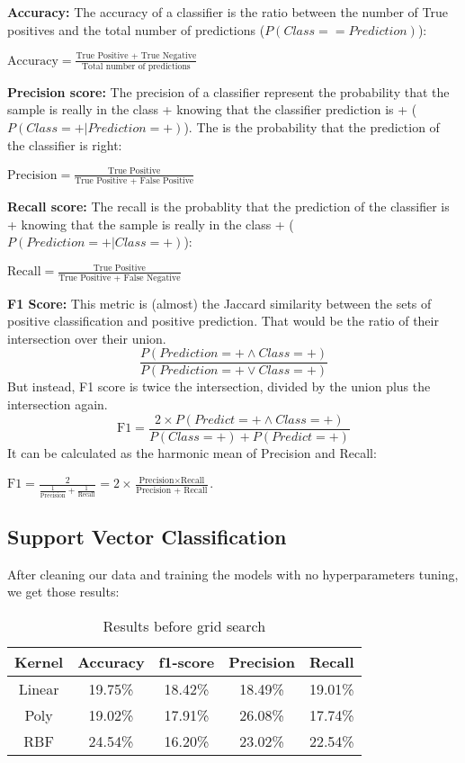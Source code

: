 \documentclass[twocolumn]{article}
\begin{document}
\textbf{Accuracy:} The accuracy of a classifier is the ratio between the number of True positives and the total number of predictions ($P(Class == Prediction)$): 

\(\displaystyle \text{Accuracy} = \frac{\text{True Positive + True Negative}}{\text{Total number of predictions}} \)

\textbf{Precision score:} The precision of a classifier represent the probability that the sample is really in the class + knowing that the classifier prediction is + ($P(Class=+ | Prediction = +)$). The is the probability that the prediction of the classifier is right:

\(\displaystyle \text{Precision} = \frac{\text{True Positive}}{\text{True Positive + False Positive}}\)

\textbf{Recall score:} The recall is the probablity that the prediction of the classifier is + knowing that the sample is really in the class + ($P(Prediction=+ | Class = +)$):

\(\displaystyle \text{Recall} = \frac{\text{True Positive}}{\text{True Positive + False Negative}}\)


\textbf{F1 Score:} This metric is (almost) the Jaccard similarity between the sets of positive classification and positive prediction. That would be the ratio of their intersection over their union. 
$$\frac{P(Prediction=+ \land Class = +)}{P(Prediction=+ \lor Class = +)}$$
But instead, F1 score is twice the intersection, divided by the union plus the intersection again.
$$\text{F1} = \frac{2 \times P(Predict =+ \land Class = +)}{P(Class = +) +  P(Predict=+)}$$
It can be calculated as the harmonic mean of Precision and Recall:

\(\displaystyle \text{F1} = \frac{2}{\frac{1}{\text{Precision}} + \frac{1}{\text{Recall}}} \displaystyle = 2 \times \frac{\text{Precision}\times\text{Recall}}{\text{Precision + Recall}} \). 

\subsection{Support Vector Classification}
After cleaning our data and training the models with no hyperparameters tuning, we get those results:

\begin{table}[h]
    \centering
    \begin{tabular}{|c|c|c|c|c|}
    \hline
      Kernel & Accuracy & f1-score & Precision & Recall\\  
      \hline
      Linear & 19.75\% & 18.42\% & 18.49\% & 19.01\%\\
        \hline
      Poly & 19.02\% & 17.91\% & 26.08\% & 17.74\% \\
        \hline
      RBF & 24.54\% & 16.20\% & 23.02\% & 22.54\% \\
    \hline
    \end{tabular}
    \label{tab:my_label}
    \caption{Results before grid search}

\end{table}
\end{document}
